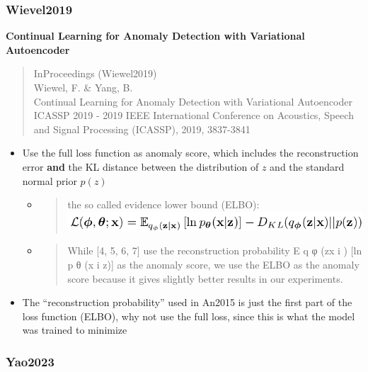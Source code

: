 \documentclass[
  letterpaper,
  DIV=11,
  numbers=noendperiod]{scrartcl}
\begin{document}
\hypertarget{wievel2019}{%
\subsubsection{Wievel2019}\label{wievel2019}}

\textbf{Continual Learning for Anomaly Detection with Variational
Autoencoder}

\begin{quote}
InProceedings (Wiewel2019)\\
Wiewel, F. \& Yang, B.\\
Continual Learning for Anomaly Detection with Variational Autoencoder\\
ICASSP 2019 - 2019 IEEE International Conference on Acoustics, Speech
and Signal Processing (ICASSP), 2019, 3837-3841
\end{quote}

\begin{itemize}
\item
  Use the full loss function as anomaly score, which includes the
  reconstruction error \textbf{and} the KL distance between the
  distribution of \(z\) and the standard normal prior \(p(z)\)

  \begin{itemize}
  \item
    \begin{quote}
    the so called evidence lower bound (ELBO):
    \includegraphics{img/2023-01-16-17-50-43.png}
    \end{quote}
  \item
    \begin{quote}
    While {[}4, 5, 6, 7{]} use the reconstruction probability E q φ
    (z\textbar x i ) {[}ln p θ (x i \textbar z){]} as the anomaly score,
    we use the ELBO as the anomaly score because it gives slightly
    better results in our experiments.
    \end{quote}
  \end{itemize}
\item
  The ``reconstruction probability'' used in An2015 is just the first
  part of the loss function (ELBO), why not use the full loss, since
  this is what the model was trained to minimize
\end{itemize}

\hypertarget{yao2023}{%
\subsubsection{Yao2023}\label{yao2023}}
\end{document}
